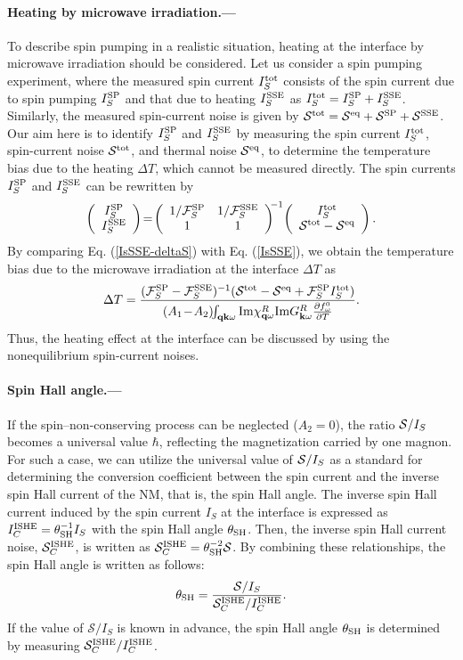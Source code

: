 \documentclass[aps,prl,reprint,showpacs]{revtex4-1}
\def\v#1{\mathbf{#1}}
\def\vq{\v{q}} 					%
\def\vk{\v{k}} 					%
\def\q{\v{q}} 					%
\def\k{\v{k}} 					%
\def\mat#1#2#3#4{\left(
\begin{array}{cc} #1 & #2 \\#3& #4\end{array} \right)}
\def\vvv#1#2{\left(
\begin{array}{c} #1  \\#2\end{array} \right)}
\def\del{\partial}
\def\IM{{\rm Im}} %
\def\ikqom{\int_{\vq\vk\omega}} %
\def\IsSSE{I_S^{\rm SSE}}
\def\IsSP{I_S^{\rm SP}}
\def\Istot{I_S^{\rm tot}}
\def\Seq{\mathcal{S}^{\rm eq}}
\def\Stot{\mathcal{S}^{\rm tot}}
\def\FSSE{\mathcal{F}^{\rm SSE}_S}
\def\FSP{\mathcal{F}^{\rm SP}_S}
\begin{document}
\paragraph{Heating by microwave irradiation.---}
To describe spin pumping in a realistic situation, heating at the interface by microwave irradiation should be considered. 
Let us consider a spin pumping experiment, where the measured spin current $I_S^{\rm tot}$ consists of the spin current due to spin pumping $I_S^{\rm SP}$ and that due to heating $I_S^{\rm SSE}$ as $I_S^{\rm tot} = I_S^{\rm SP} + I_S^{\rm SSE}$. 
Similarly, the measured spin-current noise is given by $\mathcal{S}^{\rm tot} = \mathcal{S}^{\rm eq} + \mathcal{S}^{\rm SP} + \mathcal{S}^{\rm SSE}$.
Our aim here is to identify $I_S^{\rm SP}$ and $I_S^{\rm SSE}$ by measuring the spin current $I_S^{\rm tot}$, spin-current noise $\mathcal{S}^{\rm tot}$, and thermal noise $\mathcal{S}^{\rm eq}$, to determine the temperature bias due to the heating $\Delta T$, which cannot be measured directly. 
The spin currents $I_S^{\rm SP}$ and $I_S^{\rm SSE}$ can be rewritten by
\begin{eqnarray}
\vvv{\IsSP}{\IsSSE}\!=\!\mat{1/\FSP}{1/\FSSE}{1}{1}^{\!\! -1}\! \vvv{\Istot}{\Stot - \Seq }. \label{IsSSE-deltaS}
\end{eqnarray} 
By comparing Eq. (\ref{IsSSE-deltaS}) with Eq. (\ref{IsSSE}), we obtain the temperature bias due to the microwave irradiation at the interface $\Delta T$ as
\begin{eqnarray}
\Delta T =  \frac{  (\FSP - \FSSE )^{-1} (\Stot - \Seq + \FSP\Istot )}{   (A_1\! -\! A_2) \!\! \ikqom \IM \chi^{R}_{\q\omega} \IM G^{R}_{\k\omega} \frac{\del f^0_\omega}{\del T}  }.
\end{eqnarray}
Thus, the heating effect at the interface can be discussed by using the nonequilibrium 
spin-current noises.

\paragraph{Spin Hall angle.---}
If the spin--non-conserving process can be neglected ($A_2=0$), the ratio 
${\cal S}/I_S$ becomes a universal value $\hbar$, reflecting
the magnetization carried by one magnon.
For such a case, we can utilize the universal value of ${\cal S}/I_S$
as a standard for determining the conversion coefficient between
the spin current and the inverse spin Hall current of the NM, that is, the spin Hall angle.
The inverse spin Hall current induced by the spin current $I_S$ 
at the interface is expressed as $I_C^{\rm ISHE}= \theta_{\rm SH}^{-1} I_S$ 
with the spin Hall angle $\theta_{\rm SH}$.
Then, the inverse spin Hall current noise, $\mathcal{S}_C^{\rm ISHE}$, is written as
$\mathcal{S}_C^{\rm ISHE}=\theta_{\rm SH}^{-2}\mathcal{S}$.
By combining these relationships, the spin Hall angle is written as follows:
\begin{eqnarray}
\theta_{\rm SH} = \frac{\mathcal{S}/I_S}{\mathcal{S}_C^{\rm ISHE}/I_C^{\rm ISHE}}.
\label{SpinHallAngle}
\end{eqnarray}
If the value of $\mathcal{S}/I_S$ is known in advance, the spin Hall angle $\theta_{\rm SH}$
is determined by measuring $\mathcal{S}_C^{\rm ISHE}/I_C^{\rm ISHE}$.
\end{document}
